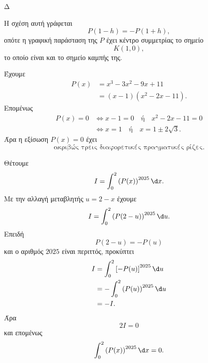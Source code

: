 \begin{thema}{Δ}
\begin{erwthma}[resume]
\begin{alist}
Η σχέση αυτή γράφεται
\[
P(1-h)=-P(1+h),
\]
οπότε η γραφική παράσταση της $P$ έχει κέντρο συμμετρίας το σημείο
\[
{K(1,0)},
\]
το οποίο είναι και το σημείο καμπής της.

\item Έχουμε
\begin{align*}
P(x)
&=x^3-3x^2-9x+11\\
&=(x-1)(x^2-2x-11).
\end{align*}
Επομένως
\begin{align*}
P(x)=0
&\Leftrightarrow
x-1=0
\quad\text{ή}\quad
x^2-2x-11=0\\
&\Leftrightarrow
x=1
\quad\text{ή}\quad
x=1\pm2\sqrt3.
\end{align*}
Άρα η εξίσωση $P(x)=0$ έχει
\[
{\text{ακριβώς τρεις διαφορετικές πραγματικές ρίζες}}.
\]
\end{alist}

\item Θέτουμε
\[
I=\int_0^2\left(P(x)\right)^{2025}\d x.
\]
Με την αλλαγή μεταβλητής $u=2-x$ έχουμε
\[
I=\int_0^2\left(P(2-u)\right)^{2025}\d u.
\]
Επειδή
\[
P(2-u)=-P(u)
\]
και ο αριθμός $2025$ είναι περιττός, προκύπτει
\begin{align*}
I
&=\int_0^2\left[-P(u)\right]^{2025}\d u\\
&=-\int_0^2\left(P(u)\right)^{2025}\d u\\
&=-I.
\end{align*}
Άρα
\[
2I=0
\]
και επομένως
\[
{\int_0^2\left(P(x)\right)^{2025}\d x=0}.
\]
\end{erwthma}
\end{thema}

